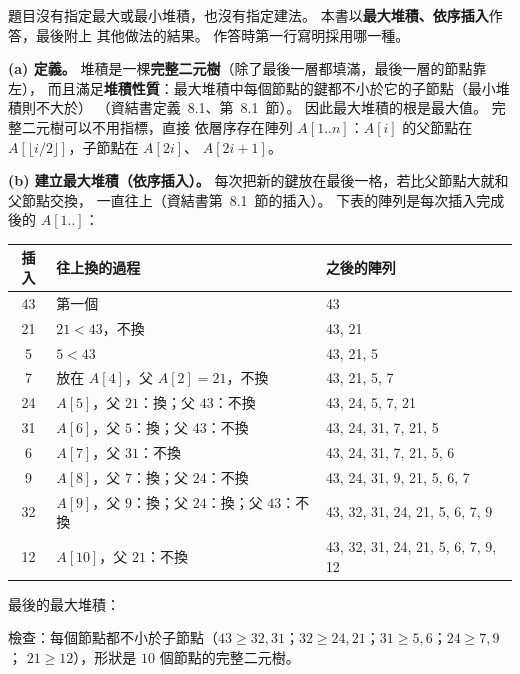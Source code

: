 \begin{pastsoln}
題目沒有指定最大或最小堆積，也沒有指定建法。 本書以\textbf{最大堆積、依序插入}作答，最後附上
其他做法的結果。 作答時第一行寫明採用哪一種。

\textbf{(a) 定義。} 堆積是一棵\textbf{完整二元樹}（除了最後一層都填滿，最後一層的節點靠左），
而且滿足\textbf{堆積性質}：最大堆積中每個節點的鍵都不小於它的子節點（最小堆積則不大於）
（資結書定義~8.1、第~8.1~節）。 因此最大堆積的根是最大值。 完整二元樹可以不用指標，直接
依層序存在陣列 $A[1..n]$：$A[i]$ 的父節點在 $A[\lfloor i/2 \rfloor]$，子節點在 $A[2i]$、
$A[2i + 1]$。

\textbf{(b) 建立最大堆積（依序插入）。} 每次把新的鍵放在最後一格，若比父節點大就和父節點交換，
一直往上（資結書第~8.1~節的插入）。 下表的陣列是每次插入完成後的 $A[1..]$：
\begin{center}
\small
\begin{tabular}{cll}
\toprule
插入 & 往上換的過程 & 之後的陣列 \\
\midrule
43 & 第一個 & 43 \\
21 & $21 < 43$，不換 & 43, 21 \\
5 & $5 < 43$ & 43, 21, 5 \\
7 & 放在 $A[4]$，父 $A[2] = 21$，不換 & 43, 21, 5, 7 \\
24 & $A[5]$，父 $21$：換；父 $43$：不換 & 43, 24, 5, 7, 21 \\
31 & $A[6]$，父 $5$：換；父 $43$：不換 & 43, 24, 31, 7, 21, 5 \\
6 & $A[7]$，父 $31$：不換 & 43, 24, 31, 7, 21, 5, 6 \\
9 & $A[8]$，父 $7$：換；父 $24$：不換 & 43, 24, 31, 9, 21, 5, 6, 7 \\
32 & $A[9]$，父 $9$：換；父 $24$：換；父 $43$：不換 & 43, 32, 31, 24, 21, 5, 6, 7, 9 \\
12 & $A[10]$，父 $21$：不換 & 43, 32, 31, 24, 21, 5, 6, 7, 9, 12 \\
\bottomrule
\end{tabular}
\end{center}
最後的最大堆積：
\begin{center}
\end{center}
檢查：每個節點都不小於子節點（$43 \ge 32, 31$；$32 \ge 24, 21$；$31 \ge 5, 6$；$24 \ge 7, 9$；
$21 \ge 12$），形狀是 $10$ 個節點的完整二元樹。


\end{pastsoln}
